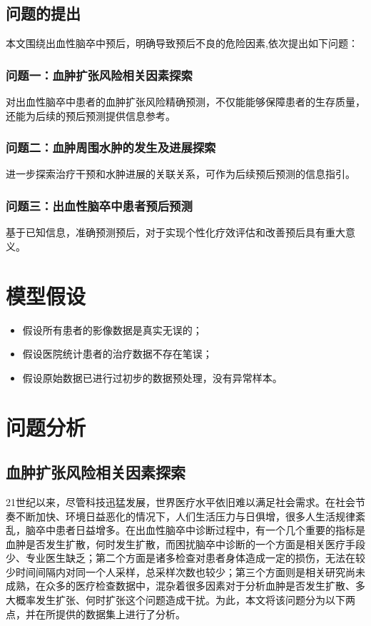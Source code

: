 \documentclass[bwprint]{gmcmthesis}
\begin{document}
\subsection{问题的提出}
本文围绕出血性脑卒中预后，明确导致预后不良的危险因素,依次提出如下问题：

\subsubsection{问题一：血肿扩张风险相关因素探索}

对出血性脑卒中患者的血肿扩张风险精确预测，不仅能能够保障患者的生存质量，还能为后续的预后预测提供信息参考。

\subsubsection{问题二：血肿周围水肿的发生及进展探索}

进一步探索治疗干预和水肿进展的关联关系，可作为后续预后预测的信息指引。

\subsubsection{问题三：出血性脑卒中患者预后预测}

基于已知信息，准确预测预后，对于实现个性化疗效评估和改善预后具有重大意义。

\section{模型假设}
\begin{itemize}
\item 假设所有患者的影像数据是真实无误的；
\item 假设医院统计患者的治疗数据不存在笔误；
\item 假设原始数据已进行过初步的数据预处理，没有异常样本。
\end{itemize}

\section{问题分析}
\subsection{血肿扩张风险相关因素探索}

21世纪以来，尽管科技迅猛发展，世界医疗水平依旧难以满足社会需求。在社会节奏不断加快、环境日益恶化的情况下，人们生活压力与日俱增，很多人生活规律紊乱，脑卒中患者日益增多。在出血性脑卒中诊断过程中，有一个几个重要的指标是血肿是否发生扩散，何时发生扩散，而困扰脑卒中诊断的一个方面是相关医疗手段少、专业医生缺乏；第二个方面是诸多检查对患者身体造成一定的损伤，无法在较少时间间隔内对同一个人采样，总采样次数也较少；第三个方面则是相关研究尚未成熟，在众多的医疗检查数据中，混杂着很多因素对于分析血肿是否发生扩散、多大概率发生扩张、何时扩张这个问题造成干扰。为此，本文将该问题分为以下两点，并在所提供的数据集上进行了分析。
\end{document}
